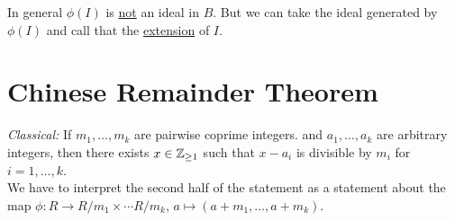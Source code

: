 \documentclass[12pt]{article}
\begin{document}
In general $\phi(I)$ is \underline{not} an ideal in $B$. But we can take the ideal generated by $\phi(I)$ and call that the \underline{extension} of $I$.
\section*{Chinese Remainder Theorem}
\textit{Classical:} If $m_1,\dots,m_k$ are pairwise coprime integers. and $a_1,\dots,a_k$ are arbitrary integers, then there exists $x\in\mathbb{Z}_{\geq1}$ such that $x-a_i$ is divisible by $m_i$ for $i=1,\dots,k$.\\
We have to interpret the second half of the statement as a statement about the map $\phi:R\to R/m_1\times\cdots R/m_k$, $a\mapsto(a+m_1,\dots,a+m_k)$.
\end{document}
